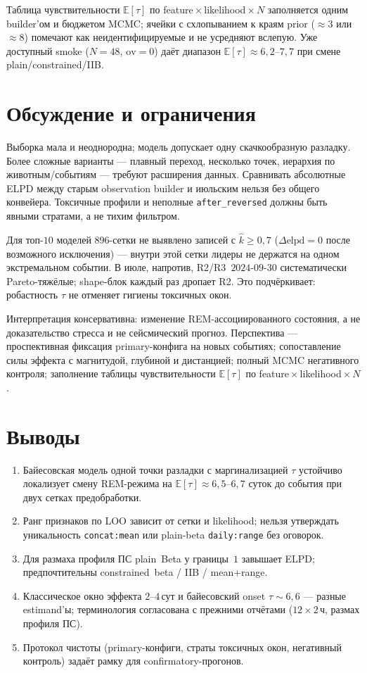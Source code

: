 \documentclass{article}
\newcommand{\elpd}{\mathrm{elpd}}
\begin{document}
Таблица чувствительности $\mathbb{E}[\tau]$ по
feature${}\times{}$likelihood${}\times{}N$ заполняется одним builder'ом
и бюджетом MCMC; ячейки с схлопыванием к краям prior ($\approx 3$ или
$\approx 8$) помечают как неидентифицируемые и не усредняют вслепую.
Уже доступный smoke ($N{=}48$, $\mathrm{ov}{=}0$) даёт диапазон
$\mathbb{E}[\tau]\approx 6{,}2$--$7{,}7$ при смене plain/constrained/IIB.

\section{Обсуждение и ограничения}

Выборка мала и неоднородна; модель допускает одну скачкообразную
разладку. Более сложные варианты --- плавный переход, несколько
точек, иерархия по животным/событиям --- требуют расширения данных.
Сравнивать абсолютные ELPD между старым observation builder и июльским
нельзя без общего конвейера. Токсичные профили и неполные
\texttt{after\_reversed} должны быть явными стратами, а не тихим
фильтром.

Для топ-$10$ моделей $896$-сетки не выявлено записей с
$\hat k\ge 0{,}7$ ($\Delta\elpd{=}0$ после возможного исключения) ---
внутри этой сетки лидеры не держатся на одном экстремальном событии.
В июле, напротив, R2/R3~$2024$-$09$-$30$ систематически Pareto-тяжёлые;
shape-блок каждый раз дропает R2. Это подчёркивает: робастность $\tau$
не отменяет гигиены токсичных окон.

Интерпретация консервативна: изменение REM-ассоциированного состояния,
а не доказательство стресса и не сейсмический прогноз. Перспектива ---
проспективная фиксация primary-конфига на новых событиях; сопоставление
силы эффекта с магнитудой, глубиной и дистанцией; полный MCMC
негативного контроля; заполнение таблицы чувствительности
$\mathbb{E}[\tau]$ по feature${}\times{}$likelihood${}\times{}N$.

\section{Выводы}

\begin{enumerate}[leftmargin=1.2em,itemsep=0.35em]
  \item Байесовская модель одной точки разладки с маргинализацией $\tau$
  устойчиво локализует смену REM-режима на $\mathbb{E}[\tau]\approx
  6{,}5$--$6{,}7$ суток до события при двух сетках предобработки.
  \item Ранг признаков по LOO зависит от сетки и likelihood; нельзя
  утверждать уникальность \texttt{concat:mean} или plain-beta
  \texttt{daily:range} без оговорок.
  \item Для размаха профиля ПС plain~Beta у границы~$1$ завышает ELPD;
  предпочтительны constrained~beta / IIB / mean+range.
  \item Классическое окно эффекта $2$--$4$\,сут и байесовский onset
  $\tau\sim 6{,}6$ --- разные estimand'ы; терминология согласована с
  прежними отчётами ($12\times 2$\,ч, размах профиля ПС).
  \item Протокол чистоты (primary-конфиги, страты токсичных окон,
  негативный контроль) задаёт рамку для confirmatory-прогонов.
\end{enumerate}
\end{document}

